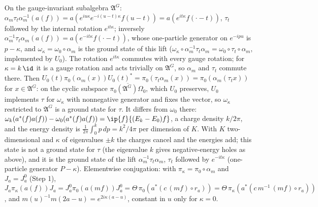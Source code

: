 On the gauge-invariant subalgebra $\mathfrak{A}^{G}$: $\alpha_{m}\tau_{t}\alpha_{m}^{-1}(a(f)) = a(e^{iu\kappa}e^{-i(u - t)\kappa}f(u - t)) = a(e^{it\kappa}f(\cdot - t))$, $\tau_{t}$ followed by the internal rotation $e^{it\kappa}$; inversely $\alpha_{m}^{-1}\tau_{t}\alpha_{m}(a(f)) = a(e^{-it\kappa}f(\cdot - t))$, whose one-particle generator on $e^{-ipu}$ is $p - \kappa$, and $\omega_{\kappa} = \omega_{0}\circ\alpha_{m}$ is the ground state of this lift ($\omega_{\kappa}\circ\alpha_{m}^{-1}\tau_{t}\alpha_{m} = \omega_{0}\circ\tau_{t}\circ\alpha_{m}$, implemented by $U_{0}$). The rotation $e^{it\kappa}$ commutes with every gauge rotation; for $\kappa = k\,\id$ it is a gauge rotation and acts trivially on $\mathfrak{A}^{G}$, so $\alpha_{m}$ and $\tau_{t}$ commute there. Then $U_{0}(t)\pi_{0}(\alpha_{m}(x))U_{0}(t)^{*} = \pi_{0}(\tau_{t}\alpha_{m}(x)) = \pi_{0}(\alpha_{m}(\tau_{t}x))$ for $x \in \mathfrak{A}^{G}$: on the cyclic subspace $\overline{\pi_{0}(\mathfrak{A}^{G})\Omega_{0}}$, which $U_{0}$ preserves, $U_{0}$ implements $\tau$ for $\omega_{\kappa}$ with nonnegative generator and fixes the vector, so $\omega_{\kappa}$ restricted to $\mathfrak{A}^{G}$ is a ground state for $\tau$. It differs from $\omega_{0}$ there: $\omega_{k}(a^{*}(f)a(f)) - \omega_{0}(a^{*}(f)a(f)) = \ip{f}{(E_{k} - E_{0})f}$, a charge density $k/2\pi$, and the energy density is $\frac{1}{2\pi}\int_{0}^{k}p\,dp = k^{2}/4\pi$ per dimension of $K$. With $K$ two-dimensional and $\kappa$ of eigenvalues $\pm k$ the charges cancel and the energies add; this state is not a ground state for $\tau$ (the eigenvalue $k$ gives negative-energy holes as above), and it is the ground state of the lift $\alpha_{m}^{-1}\tau_{t}\alpha_{m}$, $\tau_{t}$ followed by $e^{-it\kappa}$ (one-particle generator $P - \kappa$).
Elementwise conjugation: with $\pi_{\kappa} = \pi_{0}\circ\alpha_{m}$ and $J_{a} = J^{0}_{a}$ (Step 1), $J_{a}\pi_{\kappa}(a(f))J_{a} = J^{0}_{a}\pi_{0}(a(mf))J^{0}_{a} = \Theta\,\pi_{0}(a^{*}(c\,(mf)\circ r_{a})) = \Theta\,\pi_{\kappa}(a^{*}(c\,m^{-1}\,(mf)\circ r_{a}))$, and $m(u)^{-1}m(2a - u) = e^{2i\kappa(a - u)}$, constant in $u$ only for $\kappa = 0$.

